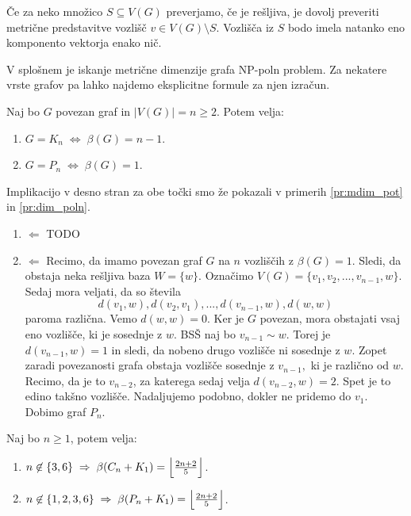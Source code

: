 \documentclass[mat1, tisk]{fmfdelo}
\newcommand{\1}{(1, 1, ..., 1)}
\newcommand{\2}{(2, 2, ..., 2)}
\begin{document}
\begin{opomba} \label{op:zadostno_preverjanje}
    Če za neko množico $S \subseteq V(G)$ preverjamo, če je rešljiva, je dovolj preveriti metrične 
    predstavitve vozlišč $v \in V(G) \setminus S.$ Vozlišča iz $S$ bodo imela natanko eno komponento 
    vektorja enako nič. 
\end{opomba}
    

V splošnem je iskanje metrične dimenzije grafa NP-poln problem. Za nekatere vrste grafov
pa lahko najdemo eksplicitne formule za njen izračun.

\begin{trditev} \label{trd:mdim_polni_pot}
    Naj bo $G$ povezan graf in $|V(G)| = n \geq 2.$ Potem velja:
    \begin{enumerate}
        \item $G = K_n \; \Leftrightarrow \; \beta(G) = n - 1.$
        \item $G = P_n \; \Leftrightarrow \; \beta(G) = 1.$
    \end{enumerate} 
\end{trditev}

\begin{dokaz}
    Implikacijo v desno stran za obe točki smo že pokazali v primerih \ref{pr:mdim_pot} in 
    \ref{pr:dim_poln}.
    \begin{enumerate}
        \item $\Leftarrow$  TODO
        \item $\Leftarrow$
        Recimo, da imamo povezan graf $G$ na $n$ vozliščih z $\beta(G) = 1.$ Sledi, da obstaja neka 
        rešljiva baza $W = \{ w \}.$ Označimo $V(G) = \{ v_1, v_2, ... , v_{n-1}, w\}.$ Sedaj mora 
        veljati, da so števila 
        $$ d(v_1, w),  d(v_2, v_1), ..., d(v_{n-1}, w), d(w, w) $$
        paroma različna. Vemo $d(w, w) = 0$. Ker je $G$ povezan, mora obstajati vsaj eno vozlišče, 
        ki je sosednje z $w$. BSŠ naj bo $v_{n-1} \sim w$. Torej je $d(v_{n-1}, w) = 1$ in sledi, 
        da nobeno drugo vozlišče ni sosednje z $w$. Zopet zaradi povezanosti grafa obstaja vozlišče 
        sosednje z $v_{n-1},$ ki je različno od $w$. Recimo, da je to $v_{n-2}$, za katerega sedaj 
        velja $d(v_{n-2}, w) = 2.$ Spet je to edino takšno vozlišče. Nadaljujemo podobno, 
        dokler ne pridemo do $v_1.$ Dobimo graf $P_n.$
    \end{enumerate}
\end{dokaz}


\begin{trditev}
    Naj bo $n\geq 1$, potem velja:
    \begin{enumerate}
        \item $n \not \in \{ 3, 6\} \; \Rightarrow \; \beta(C_n + K_1) = 
        \Bigl \lfloor \frac{2n + 2}{5}\Bigr \rfloor$.
        \item $n \not \in \{ 1, 2, 3, 6\} \; \Rightarrow \; \beta(P_n + K_1) = 
        \Bigl \lfloor \frac{2n + 2}{5}\Bigr \rfloor$.
    \end{enumerate}
\end{trditev}
\end{document}
